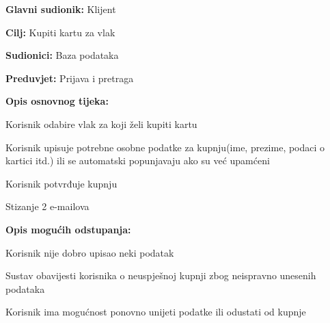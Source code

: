 					\noindent {}
					\begin{packed_item}
	
						\item \textbf{Glavni sudionik: } Klijent
						\item  \textbf{Cilj:} Kupiti kartu za vlak
						\item  \textbf{Sudionici:} Baza podataka
						\item  \textbf{Preduvjet:} Prijava i pretraga
						\item  \textbf{Opis osnovnog tijeka:}
						
						\item[] \begin{packed_enum}
	
							\item Korisnik odabire vlak za koji želi kupiti kartu
							\item Korisnik upisuje potrebne osobne podatke za kupnju(ime, prezime, podaci o kartici itd.) ili se automatski popunjavaju ako su već upamćeni
							\item Korisnik potvrđuje kupnju
							\item Stizanje 2 e-mailova
							
						\end{packed_enum}
						
						\item  \textbf{Opis mogućih odstupanja:}
						
						\item[] \begin{packed_item}
	
							\item[2.a] Korisnik nije dobro upisao neki podatak
							\item[] \begin{packed_enum}
								
								\item Sustav obavijesti korisnika o neuspješnoj kupnji zbog neispravno unesenih podataka
								\item Korisnik ima mogućnost ponovno unijeti podatke ili odustati od kupnje
								
							\end{packed_enum}
							
						\end{packed_item}
					\end{packed_item}	
					
